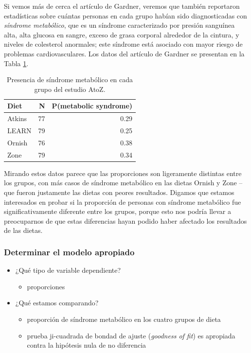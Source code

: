\documentclass[
  12pt,
]{book}
\providecommand{\tightlist}{%
  \setlength{\itemsep}{0pt}\setlength{\parskip}{0pt}}
\begin{document}
Si vemos más de cerca el artículo de Gardner, veremos que también reportaron estadísticas sobre cuántas personas en cada grupo habían sido diagnosticadas con \emph{síndrome metabólico}, que es un síndrome caracterizado por presión sanguínea alta, alta glucosa en sangre, exceso de grasa corporal alrededor de la cintura, y niveles de colesterol anormales; este síndrome está asociado con mayor riesgo de problemas cardiovasculares. Los datos del artículo de Gardner se presentan en la Tabla \ref{tab:metsymData}.

\begin{table}

\caption{\label{tab:metsymData}Presencia de síndrome metabólico en cada grupo del estudio AtoZ.}
\centering
\begin{tabular}[t]{l|r|r}
\hline
Diet & N & P(metabolic syndrome)\\
\hline
Atkins & 77 & 0.29\\
\hline
LEARN & 79 & 0.25\\
\hline
Ornish & 76 & 0.38\\
\hline
Zone & 79 & 0.34\\
\hline
\end{tabular}
\end{table}

Mirando estos datos parece que las proporciones son ligeramente distintas entre los grupos, con más casos de síndrome metabólico en las dietas Ornish y Zone -- que fueron justamente las dietas con peores resultados. Digamos que estamos interesados en probar si la proporción de personas con síndrome metabólico fue significativamente diferente entre los grupos, porque esto nos podría llevar a preocuparnos de que estas diferencias hayan podido haber afectado los resultados de las dietas.

\hypertarget{determinar-el-modelo-apropiado}{%
\subsubsection{Determinar el modelo apropiado}\label{determinar-el-modelo-apropiado}}

\begin{itemize}
\tightlist
\item
  ¿Qué tipo de variable dependiente?

  \begin{itemize}
  \tightlist
  \item
    proporciones
  \end{itemize}
\item
  ¿Qué estamos comparando?

  \begin{itemize}
  \tightlist
  \item
    proporción de síndrome metabólico en los cuatro grupos de dieta
  \item
    prueba ji-cuadrada de bondad de ajuste (\emph{goodness of fit}) es apropiada contra la hipótesis nula de no diferencia
  \end{itemize}
\end{itemize}
\end{document}
